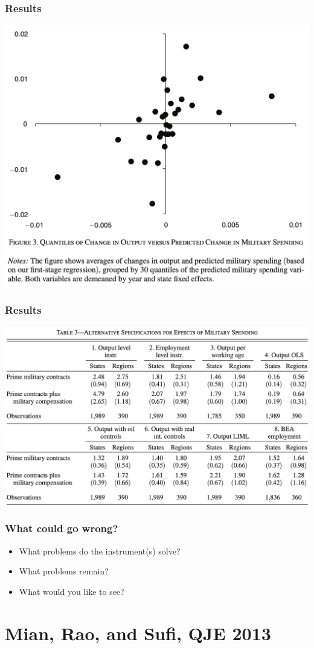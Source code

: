 \documentclass[english,xcolor=svgnames]{beamer}
\begin{document}
\begin{frame}
\frametitle[alignment=center]{Results}
\centering
\includegraphics[scale=0.5]{figures/NSFIG3.png}
\end{frame}

\begin{frame}
\frametitle[alignment=center]{Results}
\centering
\includegraphics[scale=0.5]{figures/NSTAB3.png}
\end{frame}

\begin{frame}
\frametitle[alignment=center]{What could go wrong?}
\begin{itemize}
	\item What problems do the instrument(s) solve?
	\item What problems remain?
	\item What would you like to see?
\end{itemize}
\end{frame}




\section{Mian, Rao, and Sufi, QJE 2013}
\end{document}
